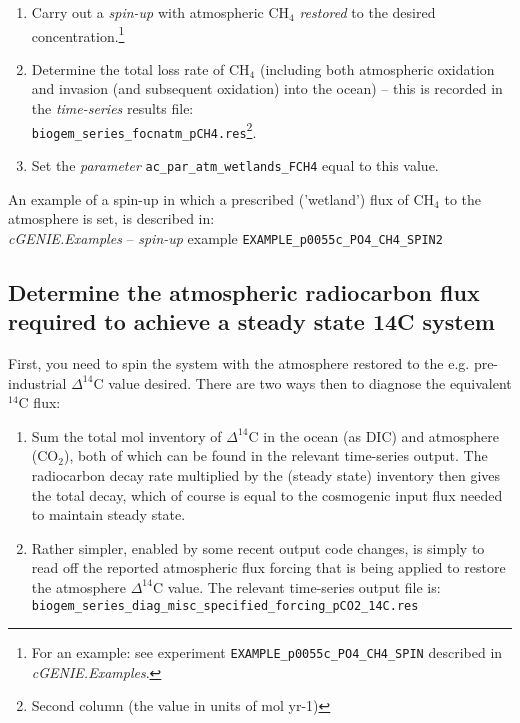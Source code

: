 \documentclass[11pt,fleqn]{book} %
\begin{document}
\begin{enumerate}[noitemsep]

\vspace{1mm}
        \item Carry out a \textit{spin-up} with atmospheric CH\(_{4}\) \textit{restored} to the desired concentration.\footnote{For an example: see experiment \texttt{EXAMPLE\_p0055c\_PO4\_CH4\_SPIN} described in \textit{cGENIE.Examples}.}

\vspace{1mm}
        \item Determine the total loss rate of CH\(_{4}\) (including both atmospheric oxidation and invasion (and subsequent oxidation) into the ocean) -- this is recorded in the \textit{time-series} results file:\\ \texttt{biogem\_series\_focnatm\_pCH4.res}\footnote{Second column (the value in units of mol yr-1)}.

\vspace{1mm}
        \item Set the \textit{parameter} \texttt{ac\_par\_atm\_wetlands\_FCH4} equal to this value.
\end{enumerate}

An example of a spin-up in which a prescribed ('wetland') flux of CH\(_{4}\) to the atmosphere is set, is described in:\\ \textit{cGENIE.Examples} -- \textit{spin-up} example \texttt{EXAMPLE\_p0055c\_PO4\_CH4\_SPIN2}

%
\newpage
\subsection*{Determine the atmospheric radiocarbon flux required to achieve a steady state 14C system}
\vspace{1mm}

First, you need to spin the system with the atmosphere restored to the e.g. pre-industrial \(\Delta^{14}\)C value desired. There are two ways then to diagnose the equivalent \(^{14}\)C flux:

\begin{enumerate}[noitemsep]

\vspace{1mm}
\item Sum the total mol inventory of \(\Delta^{14}\)C in the ocean (as DIC) and atmosphere (CO\(_{2}\)), both of which can be found in the relevant time-series output. The radiocarbon decay rate multiplied by the (steady state) inventory then gives the total decay, which of course is equal to the cosmogenic input flux needed to maintain steady state.

\vspace{1mm}
\item Rather simpler, enabled by some recent output code changes, is simply to read off the reported atmospheric flux forcing that is being applied to restore the atmosphere \(\Delta^{14}\)C value. The relevant time-series output file is:
\\\texttt{biogem\_series\_diag\_misc\_specified\_forcing\_pCO2\_14C.res}

\end{enumerate}
\end{document}
